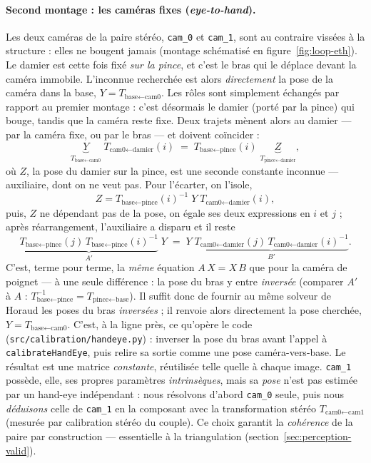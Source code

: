 \paragraph{Second montage : les caméras fixes (\emph{eye-to-hand}).} Les deux caméras de la paire stéréo, \texttt{cam\_0} et \texttt{cam\_1}, sont au contraire vissées à la structure : elles ne bougent jamais (montage schématisé en figure~\ref{fig:loop-eth}). Le damier est cette fois fixé \emph{sur la pince}, et c'est le bras qui le déplace devant la caméra immobile. L'inconnue recherchée est alors \emph{directement} la pose de la caméra dans la base, $Y = T_{\text{base}\leftarrow\text{cam0}}$. Les rôles sont simplement échangés par rapport au premier montage : c'est désormais le damier (porté par la pince) qui bouge, tandis que la caméra reste fixe. Deux trajets mènent alors au damier --- par la caméra fixe, ou par le bras --- et doivent coïncider :
\[
  \underbrace{Y}_{T_{\text{base}\leftarrow\text{cam0}}}\; T_{\text{cam0}\leftarrow\text{damier}}(i)
  \;=\; T_{\text{base}\leftarrow\text{pince}}(i)\; \underbrace{Z}_{T_{\text{pince}\leftarrow\text{damier}}} ,
\]
où $Z$, la pose du damier sur la pince, est une seconde constante inconnue --- auxiliaire, dont on ne veut pas. Pour l'écarter, on l'isole,
\[
  Z = T_{\text{base}\leftarrow\text{pince}}(i)^{-1}\; Y\; T_{\text{cam0}\leftarrow\text{damier}}(i) ,
\]
puis, $Z$ ne dépendant pas de la pose, on égale ses deux expressions en $i$ et $j$ ; après réarrangement, l'auxiliaire a disparu et il reste
\[
  \underbrace{T_{\text{base}\leftarrow\text{pince}}(j)\,T_{\text{base}\leftarrow\text{pince}}(i)^{-1}}_{A'}\; Y
  \;=\; Y\;
  \underbrace{T_{\text{cam0}\leftarrow\text{damier}}(j)\,T_{\text{cam0}\leftarrow\text{damier}}(i)^{-1}}_{B'} .
\]
C'est, terme pour terme, la \emph{même} équation $A\,X = X\,B$ que pour la caméra de poignet --- à une seule différence : la pose du bras y entre \emph{inversée} (comparer $A'$ à $A$ : $T_{\text{base}\leftarrow\text{pince}}^{-1} = T_{\text{pince}\leftarrow\text{base}}$). Il suffit donc de fournir au même solveur de Horaud les poses du bras \emph{inversées} ; il renvoie alors directement la pose cherchée, $Y = T_{\text{base}\leftarrow\text{cam0}}$. C'est, à la ligne près, ce qu'opère le code (\texttt{src/calibration/handeye.py}) : inverser la pose du bras avant l'appel à \texttt{calibrateHandEye}, puis relire sa sortie comme une pose caméra-vers-base. Le résultat est une matrice \emph{constante}, réutilisée telle quelle à chaque image. \texttt{cam\_1} possède, elle, ses propres paramètres \emph{intrinsèques}, mais sa \emph{pose} n'est pas estimée par un hand-eye indépendant : nous résolvons d'abord \texttt{cam\_0} seule, puis nous \emph{déduisons} celle de \texttt{cam\_1} en la composant avec la transformation stéréo $T_{\text{cam0}\leftarrow\text{cam1}}$ (mesurée par calibration stéréo du couple). Ce choix garantit la \emph{cohérence} de la paire par construction --- essentielle à la triangulation (section~\ref{sec:perception-valid}).

